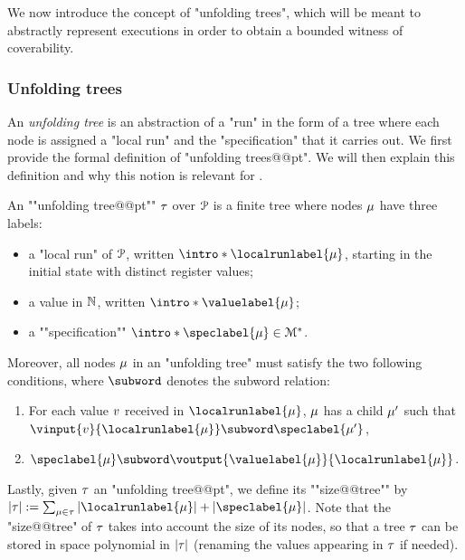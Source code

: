  We  now introduce the concept of "unfolding trees", which will be meant to abstractly represent executions in order to obtain a bounded witness of coverability.

\subsubsection{Unfolding trees}
\label{sec:unfolding_tree_partitioned}
An \emph{unfolding tree} is an abstraction of a "run" in the form of a tree where each node is assigned a "local run" and the "specification" that it carries out. 
We first provide the formal definition of "unfolding trees@@pt". We will then explain this definition and why this notion is relevant for \COVER. 

\begin{definition}
\label{def:unfolding_tree_partitioned}
\AP An ""unfolding tree@@pt"" $\tau$ over $\mathcal{P}$ is
a finite tree where nodes $\mu$ have three labels:
\begin{itemize}
	\item a "local run" of $\mathcal{P}$, written $\intro*\localrunlabel{\node}$, starting in the initial state with distinct register values;
	
	\item a value in $\mathbb{N}$, written $\intro*\valuelabel{\node}$;
	
	\item a ""specification"" $\intro*\speclabel{\node} \in \messages^*$.
\end{itemize} 
Moreover, all nodes $\mu$ in an "unfolding tree" must satisfy the two following conditions, where $\subword$ denotes the subword relation:
\begin{enumerate}[label= (\roman*), ref=(\roman*)]
	\item \label{item:condition1_non_initial_value_pt} For each value $v$ received in $\localrunlabel{\node}$, $\mu$ has a child $\mu'$ such that $\vinput{\aval}{\localrunlabel{\node}} \subword \speclabel{\node'}$,
	\item \label{item:condition4_boss_node_pt} $\speclabel{\node} \subword \voutput{\valuelabel{\node}}{\localrunlabel{\node}}$.
\end{enumerate}

\AP Lastly, given $\tau$ an "unfolding tree@@pt", we define its ""size@@tree"" by $\size{\tree} := \sum_{\node \in \tree} \size{\localrunlabel{\node}} + \size{\speclabel{\node}}$. Note that the "size@@tree" of $\tau$ takes into account the size of its nodes, so that a tree $\tau$ can be stored in space polynomial in $|\tau|$ (renaming the values appearing in $\tau$ if needed). 
\end{definition}

